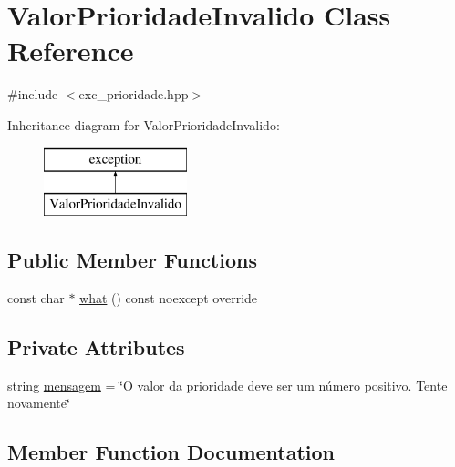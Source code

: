 \hypertarget{classValorPrioridadeInvalido}{}\section{Valor\+Prioridade\+Invalido Class Reference}
\label{classValorPrioridadeInvalido}


{\ttfamily \#include $<$exc\+\_\+prioridade.\+hpp$>$}

Inheritance diagram for Valor\+Prioridade\+Invalido\+:\begin{figure}[H]
\begin{center}
\leavevmode
\includegraphics[height=2.000000cm]{classValorPrioridadeInvalido}
\end{center}
\end{figure}
\subsection*{Public Member Functions}
\begin{DoxyCompactItemize}
\item 
const char $\ast$ \hyperlink{classValorPrioridadeInvalido_a5cf2c87a65131e2e56848784c4dc77ea}{what} () const noexcept override
\end{DoxyCompactItemize}
\subsection*{Private Attributes}
\begin{DoxyCompactItemize}
\item 
string \hyperlink{classValorPrioridadeInvalido_af0cc68ad2ec7183808dc1a222a5cfa98}{mensagem} = \char`\"{}O valor da prioridade deve ser um número positivo. Tente novamente\char`\"{}
\end{DoxyCompactItemize}


\subsection{Member Function Documentation}
\mbox{\label{classValorPrioridadeInvalido_a5cf2c87a65131e2e56848784c4dc77ea}} 
